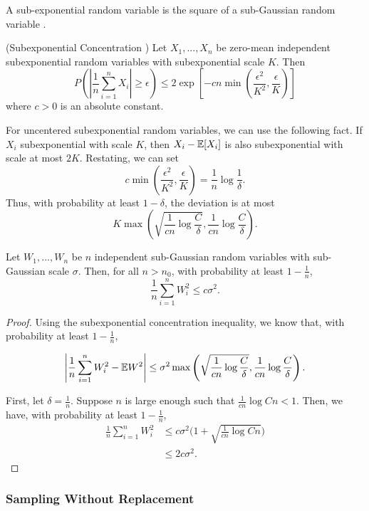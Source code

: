 A sub-exponential random variable is the square of a sub-Gaussian random
variable \cite{vershynin2010introduction}.

\begin{proposition} (Subexponential Concentration
  \cite{vershynin2010introduction})
Let $X_1,...,X_n$ be zero-mean independent subexponential random
variables with subexponential scale $K$. 
Then
\[
P( | \frac{1}{n} \sum_{i=1}^n X_i | \geq \epsilon) \leq
	2 \exp \left[ -c n \min\left( \frac{\epsilon^2}{K^2}, \frac{\epsilon}{K} \right) \right]
\]
where $c > 0$ is an absolute constant.
\end{proposition}

For uncentered subexponential random variables, we can use the following fact. If $X_i$ subexponential with scale $K$, then $X_i - {\mathbb E}[X_i]$ is also subexponential with scale at most $2K$.
Restating, we can set
\[
c \min\left( \frac{\epsilon^2}{K^2}, \frac{\epsilon}{K} \right) = \frac{1}{n} \log \frac{1}{\delta}.
\]
Thus, with probability at least $1-\delta$, the deviation is at most
\[
K \max\left( \sqrt{\frac{1}{cn} \log \frac{C}{\delta}},  \frac{1}{cn} \log \frac{C}{\delta} \right).
\]


\begin{corollary}
Let $W_1,...,W_n$ be $n$ independent sub-Gaussian random variables with sub-Gaussian scale $\sigma$. 
Then, for all $n > n_0$, with probability at least $1- \frac{1}{n}$,
\[
\frac{1}{n} \sum_{i=1}^n W_i^2 \leq c \sigma^2 .
\]
\end{corollary}

\begin{proof}
Using the subexponential concentration inequality, we know that, with probability at least $1-\frac{1}{n}$, 

\[
\left| \frac{1}{n} \sum_{i=1}^n W_i^2 - {\mathbb E} W^2\right| \leq \sigma^2 \max\left( \sqrt{\frac{1}{cn} \log \frac{C}{\delta}}, \frac{1}{cn}\log \frac{C}{\delta} \right).
\]

First, let $\delta = \frac{1}{n}$. Suppose $n$ is large enough such that $ \frac{1}{cn} \log Cn < 1$. Then, we have, with probability at least $1-\frac{1}{n}$,
\begin{align*}
 \frac{1}{n} \sum_{i=1}^n W_i^2 &\leq c\sigma^2 \Big(1+\sqrt{\frac{1}{cn} \log Cn}\Big) \\
		&\leq 2 c \sigma^2.
 \end{align*}
\end{proof}


\subsubsection{Sampling Without Replacement}

